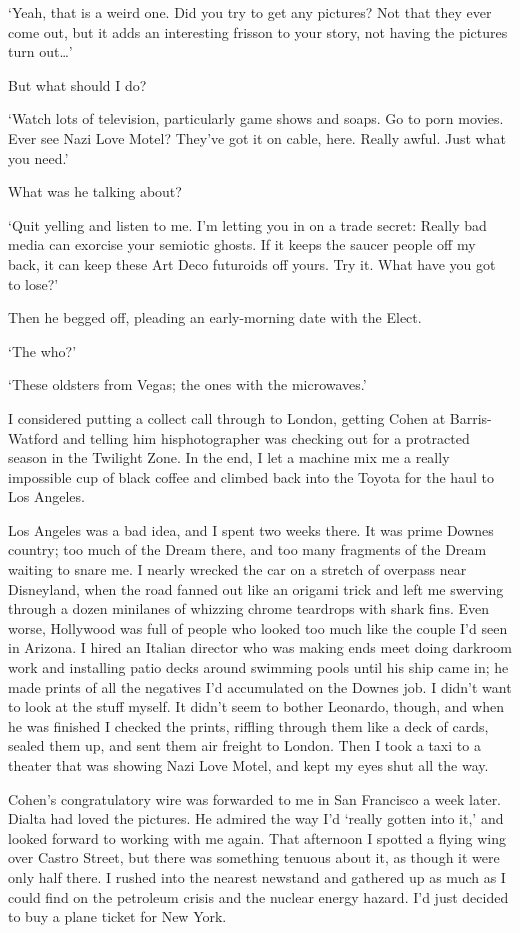 `Yeah, that is a weird one. Did you try to get any pictures? Not that they ever come out, but it adds an interesting frisson to your story, not having the pictures turn out…'

But what should I do?

`Watch lots of television, particularly game shows and soaps. Go to porn movies. Ever see Nazi Love Motel? They've got it on cable, here. Really awful. Just what you need.'

What was he talking about?

`Quit yelling and listen to me. I'm letting you in on a trade secret: Really bad media can exorcise your semiotic ghosts. If it keeps the saucer people off my back, it can keep these Art Deco futuroids off yours. Try it. What have you got to lose?'

Then he begged off, pleading an early-morning date with the Elect.

`The who?'

`These oldsters from Vegas; the ones with the microwaves.'

I considered putting a collect call through to London, getting Cohen at Barris-Watford and telling him hisphotographer was checking out for a protracted season in the Twilight Zone. In the end, I let a machine mix me a really impossible cup of black coffee and climbed back into the Toyota for the haul to Los Angeles.

Los Angeles was a bad idea, and I spent two weeks there. It was prime Downes country; too much of the Dream there, and too many fragments of the Dream waiting to snare me. I nearly wrecked the car on a stretch of overpass near Disneyland, when the road fanned out like an origami trick and left me swerving through a dozen minilanes of whizzing chrome teardrops with shark fins. Even worse, Hollywood was full of people who looked too much like the couple I'd seen in Arizona. I hired an Italian director who was making ends meet doing darkroom work and installing patio decks around swimming pools until his ship came in; he made prints of all the negatives I'd accumulated on the Downes job. I didn't want to look at the stuff myself. It didn't seem to bother Leonardo, though, and when he was finished I checked the prints, riffling through them like a deck of cards, sealed them up, and sent them air freight to London. Then I took a taxi to a theater that was showing Nazi Love Motel, and kept my eyes shut all the way.

Cohen's congratulatory wire was forwarded to me in San Francisco a week later. Dialta had loved the pictures. He admired the way I'd `really gotten into it,' and looked forward to working with me again. That afternoon I spotted a flying wing over Castro Street, but there was something tenuous about it, as though it were only half there. I rushed into the nearest newstand and gathered up as much as I could find on the petroleum crisis and the nuclear energy hazard. I'd just decided to buy a plane ticket for New York.

